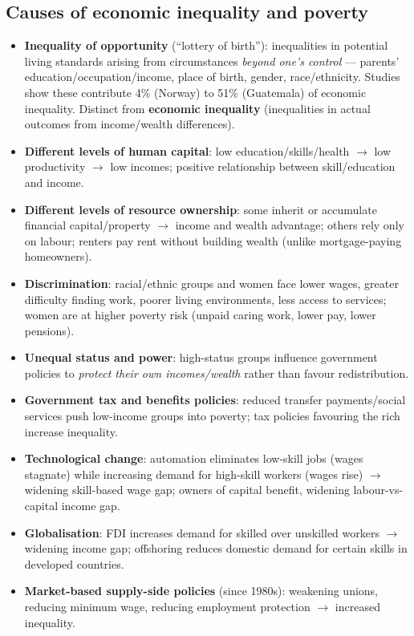 \subsection{Causes of economic inequality and poverty}
\begin{itemize}
  \item \textbf{Inequality of opportunity} (``lottery of birth''): inequalities in potential living standards arising from circumstances \textit{beyond one's control} --- parents' education/occupation/income, place of birth, gender, race/ethnicity. Studies show these contribute 4\% (Norway) to 51\% (Guatemala) of economic inequality. Distinct from \textbf{economic inequality} (inequalities in actual outcomes from income/wealth differences).
  \item \textbf{Different levels of human capital}: low education/skills/health $\to$ low productivity $\to$ low incomes; positive relationship between skill/education and income.
  \item \textbf{Different levels of resource ownership}: some inherit or accumulate financial capital/property $\to$ income and wealth advantage; others rely only on labour; renters pay rent without building wealth (unlike mortgage-paying homeowners).
  \item \textbf{Discrimination}: racial/ethnic groups and women face lower wages, greater difficulty finding work, poorer living environments, less access to services; women are at higher poverty risk (unpaid caring work, lower pay, lower pensions).
  \item \textbf{Unequal status and power}: high-status groups influence government policies to \textit{protect their own incomes/wealth} rather than favour redistribution.
  \item \textbf{Government tax and benefits policies}: reduced transfer payments/social services push low-income groups into poverty; tax policies favouring the rich increase inequality.
  \item \textbf{Technological change}: automation eliminates low-skill jobs (wages stagnate) while increasing demand for high-skill workers (wages rise) $\to$ widening skill-based wage gap; owners of capital benefit, widening labour-vs-capital income gap.
  \item \textbf{Globalisation}: FDI increases demand for skilled over unskilled workers $\to$ widening income gap; offshoring reduces domestic demand for certain skills in developed countries.
  \item \textbf{Market-based supply-side policies} (since 1980s): weakening unions, reducing minimum wage, reducing employment protection $\to$ increased inequality.

\end{itemize}
